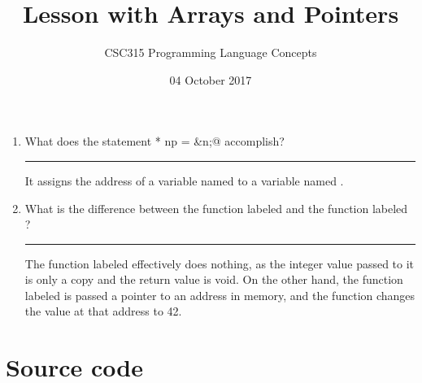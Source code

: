 \documentclass[twoside]{article}
\title{Lesson with Arrays and Pointers}
\author{CSC315 Programming Language Concepts}
\date{04 October 2017}
\newenvironment{answer}
  { \vspace*{12pt}

    \rule{12cm}{0.02cm}

    \vspace*{12pt}

    \hspace*{1.0cm}
    \begin{minipage}{10cm}}
  {\end{minipage} \vspace*{12pt}}
\begin{document}
\maketitle

\begin{enumerate}
  \item What does the statement \lstinline@int* np = &n;@ accomplish?

  \begin{answer}
    It assigns the address of a variable named \lstinline@n@ to
    a variable named \lstinline@np@.
    \end{answer}

  \item What is the difference between the function labeled \lstinline@f@
  and the function labeled \lstinline@g@?

  \begin{answer}
    The function labeled \lstinline@f@ effectively does nothing, as the
    integer value passed to it is only a copy and the return value is void.
    On the other hand, the function labeled \lstinline@g@ is passed a pointer
    to an address in memory, and the function changes the value at that address
    to 42.
    \end{answer}

  \end{enumerate}


\section{Source code}
\end{document}
